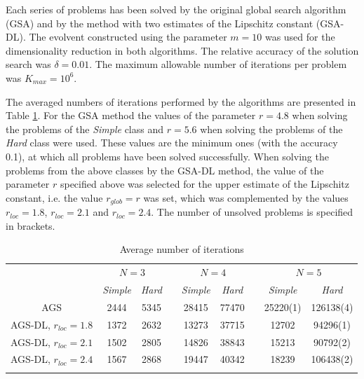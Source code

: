 \documentclass[runningheads]{llncs}
\begin{document}
Each series of problems has been solved by the original global search algorithm (GSA) and by the method with two estimates of the Lipschitz constant (GSA-DL). The evolvent constructed using the parameter $m = 10$ was used for the dimensionality reduction in both algorithms. The relative accuracy of the solution search was $\delta = 0.01$. 
The maximum allowable number of iterations per problem was $K_{max} = 10^6$.

The averaged numbers of iterations performed by the algorithms are presented in Table \ref{tab:1}.
For the GSA method the values of the parameter $r=4.8$ when solving the problems of the \textit{Simple} class and $r=5.6$ when solving the problems of the \textit{Hard} class were used. 
These values are the minimum ones (with the accuracy 0.1), at which all problems have been solved successfully.
When solving the problems from the above classes by the GSA-DL method, the value of the parameter $r$ specified above was selected for the upper estimate of the Lipschitz constant, i.e. the value $r_{glob} = r$ was set, which was complemented by the values $r_{loc}=1.8$, $r_{loc}=2.1$ and $r_{loc}=2.4$. 
The number of unsolved problems is specified in brackets.

\begin{table}
	\caption{Average number of iterations}
	\label{tab:1}
	\center
	\begin{tabular}{ccccccccc}
		\hline\noalign{\smallskip}
		 & \multicolumn{2}{c}{$N=3$} & & \multicolumn{2}{c}{$N=4$} & & \multicolumn{2}{c}{$N=5$}  \\
		\noalign{\smallskip} \cline{2-3} \cline{5-6} \cline{8-9} \noalign{\smallskip}
		 & \textit{Simple} & \textit{Hard} & & \textit{Simple} & \textit{Hard} & & \textit{Simple} & \textit{Hard}  \\
		\noalign{\smallskip} \hline \noalign{\smallskip}
									AGS	&	2444	&	5345	& &	28415	&	77470	& & 25220(1) & 126138(4)		\\
AGS-DL, $r_{loc}=1.8$	&	1372	&	2632	& &	13273	&	37715	& &	12702    & 94296(1)			\\
AGS-DL, $r_{loc}=2.1$	&	1502	&	2805	& &	14826	&	38843	& &	15213    & 90792(2)			\\
AGS-DL, $r_{loc}=2.4$	&	1567	&	2868	& &	19447	&	40342	& &	18239    & 106438(2)		\\
		\noalign{\smallskip}\hline
	\end{tabular}
\end{table}
\end{document}
